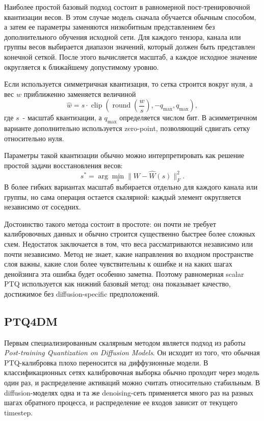 \documentclass[a4paper,12pt]{article}
\begin{document}
Наиболее простой базовый подход состоит в равномерной пост-тренировочной квантизации весов. В этом случае модель сначала обучается обычным способом, а затем ее параметры заменяются низкобитным представлением без дополнительного обучения исходной сети. Для каждого тензора, канала или группы весов выбирается диапазон значений, который должен быть представлен конечной сеткой. После этого вычисляется масштаб, а каждое исходное значение округляется к ближайшему допустимому уровню.

Если используется симметричная квантизация, то сетка строится вокруг нуля, а вес $w$ приближенно заменяется величиной
\[
    \widehat{w} = s \cdot \operatorname{clip}\left(\operatorname{round}\left(\frac{w}{s}\right), -q_{\max}, q_{\max}\right),
\]
где $s$~- масштаб квантизации, а $q_{\max}$ определяется числом бит. В асимметричном варианте дополнительно используется zero-point, позволяющий сдвигать сетку относительно нуля.

Параметры такой квантизации обычно можно интерпретировать как решение простой задачи восстановления весов:
\[
    s^* = \arg\min_s \|W - \widehat{W}(s)\|_F^2.
\]
В более гибких вариантах масштаб выбирается отдельно для каждого канала или группы, но сама операция остается скалярной: каждый элемент округляется независимо от соседних.

Достоинство такого метода состоит в простоте: он почти не требует калибровочных данных и обычно строится существенно быстрее более сложных схем. Недостаток заключается в том, что веса рассматриваются независимо или почти независимо. Метод не знает, какие направления во входном пространстве слоя важны, какие слои более чувствительны к ошибке и на каких шагах денойзинга эта ошибка будет особенно заметна. Поэтому равномерная scalar PTQ используется как нижний базовый метод: она показывает качество, достижимое без diffusion-specific предположений.

\subsection{PTQ4DM}

Первым специализированным скалярным методом является подход из работы \textit{Post-training Quantization on Diffusion Models}. Он исходит из того, что обычная PTQ-калибровка плохо переносится на диффузионные модели. В классификационных сетях калибровочная выборка обычно проходит через модель один раз, и распределение активаций можно считать относительно стабильным. В diffusion-моделях одна и та же denoising-сеть применяется много раз на разных шагах обратного процесса, и распределение ее входов зависит от текущего timestep.
\end{document}
